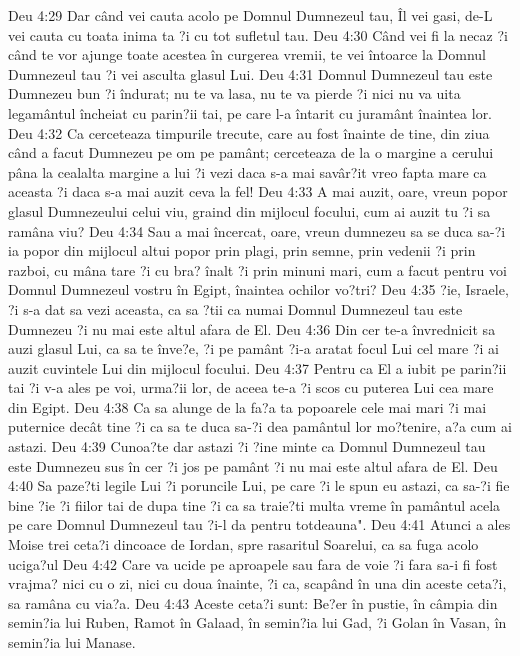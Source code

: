 Deu 4:29  Dar când vei cauta acolo pe Domnul Dumnezeul tau, Îl vei gasi, de-L vei cauta cu toata inima ta ?i cu tot sufletul tau.
Deu 4:30  Când vei fi la necaz ?i când te vor ajunge toate acestea în curgerea vremii, te vei întoarce la Domnul Dumnezeul tau ?i vei asculta glasul Lui.
Deu 4:31  Domnul Dumnezeul tau este Dumnezeu bun ?i îndurat; nu te va lasa, nu te va pierde ?i nici nu va uita legamântul încheiat cu parin?ii tai, pe care l-a întarit cu juramânt înaintea lor.
Deu 4:32  Ca cerceteaza timpurile trecute, care au fost înainte de tine, din ziua când a facut Dumnezeu pe om pe pamânt; cerceteaza de la o margine a cerului pâna la cealalta margine a lui ?i vezi daca s-a mai savâr?it vreo fapta mare ca aceasta ?i daca s-a mai auzit ceva la fel!
Deu 4:33  A mai auzit, oare, vreun popor glasul Dumnezeului celui viu, graind din mijlocul focului, cum ai auzit tu ?i sa ramâna viu?
Deu 4:34  Sau a mai încercat, oare, vreun dumnezeu sa se duca sa-?i ia popor din mijlocul altui popor prin plagi, prin semne, prin vedenii ?i prin razboi, cu mâna tare ?i cu bra? înalt ?i prin minuni mari, cum a facut pentru voi Domnul Dumnezeul vostru în Egipt, înaintea ochilor vo?tri?
Deu 4:35  ?ie, Israele, ?i s-a dat sa vezi aceasta, ca sa ?tii ca numai Domnul Dumnezeul tau este Dumnezeu ?i nu mai este altul afara de El.
Deu 4:36  Din cer te-a învrednicit sa auzi glasul Lui, ca sa te înve?e, ?i pe pamânt ?i-a aratat focul Lui cel mare ?i ai auzit cuvintele Lui din mijlocul focului.
Deu 4:37  Pentru ca El a iubit pe parin?ii tai ?i v-a ales pe voi, urma?ii lor, de aceea te-a ?i scos cu puterea Lui cea mare din Egipt.
Deu 4:38  Ca sa alunge de la fa?a ta popoarele cele mai mari ?i mai puternice decât tine ?i ca sa te duca sa-?i dea pamântul lor mo?tenire, a?a cum ai astazi.
Deu 4:39  Cunoa?te dar astazi ?i ?ine minte ca Domnul Dumnezeul tau este Dumnezeu sus în cer ?i jos pe pamânt ?i nu mai este altul afara de El.
Deu 4:40  Sa paze?ti legile Lui ?i poruncile Lui, pe care ?i le spun eu astazi, ca sa-?i fie bine ?ie ?i fiilor tai de dupa tine ?i ca sa traie?ti multa vreme în pamântul acela pe care Domnul Dumnezeul tau ?i-l da pentru totdeauna".
Deu 4:41  Atunci a ales Moise trei ceta?i dincoace de Iordan, spre rasaritul Soarelui, ca sa fuga acolo uciga?ul
Deu 4:42  Care va ucide pe aproapele sau fara de voie ?i fara sa-i fi fost vrajma? nici cu o zi, nici cu doua înainte, ?i ca, scapând în una din aceste ceta?i, sa ramâna cu via?a.
Deu 4:43  Aceste ceta?i sunt: Be?er în pustie, în câmpia din semin?ia lui Ruben, Ramot în Galaad, în semin?ia lui Gad, ?i Golan în Vasan, în semin?ia lui Manase.
